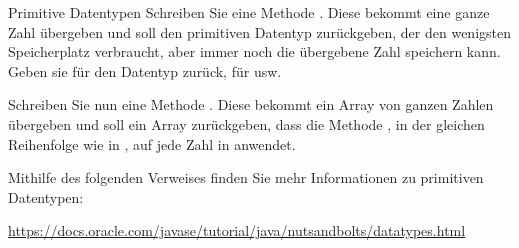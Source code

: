 \documentclass{../tuda-exercise}
\begin{document}
  \clearpage

  \begin{task}[credit=\stars{2}{3}]{Primitive Datentypen}
    Schreiben Sie eine Methode . Diese bekommt eine ganze
    Zahl übergeben und soll den primitiven Datentyp zurückgeben, der den wenigsten Speicherplatz
    verbraucht, aber immer noch die übergebene Zahl speichern kann. Geben sie
    \code{\textcolor{stringcolor}{"'l"'}} für den Datentyp  zurück,
    \code{\textcolor{stringcolor}{"' i"'}} für  usw.

    \br

    Schreiben Sie nun eine Methode . Diese bekommt ein
    Array von ganzen Zahlen übergeben und soll ein Array zurückgeben, dass die Methode
    , in der gleichen Reihenfolge wie in , auf
    jede Zahl in  anwendet.

    \begin{solution}
      

      \begin{note}[title=Information:]
        Mithilfe des folgenden Verweises finden Sie mehr Informationen zu primitiven Datentypen:

        \begin{center}
          \url{https://docs.oracle.com/javase/tutorial/java/nutsandbolts/datatypes.html}
        \end{center}
      \end{note}
    \end{solution}
  \end{task}
\end{document}
